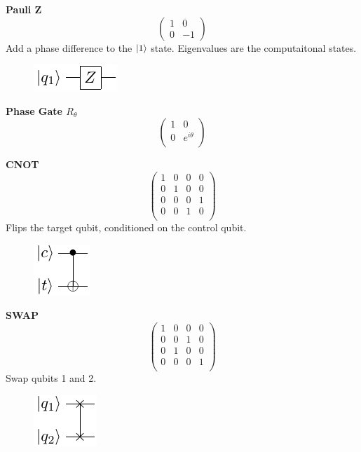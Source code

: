 \documentclass[11pt]{article}
\begin{document}
\textbf{Pauli Z}
\[\begin{pmatrix}
1 & 0 \\
0 & -1
\end{pmatrix}
\]
Add a phase difference to the $\ket{1}$ state. Eigenvalues are the computaitonal states.

\begin{figure}[h]
    \centering
    \includegraphics[width=.2\textwidth]{Circuits/Z.pdf}
\end{figure}

\textbf{Phase Gate $R_{\theta}$}
\[\begin{pmatrix}
1 & 0 \\
0 & e^{i\theta}\\
\end{pmatrix}\]

\textbf{CNOT}
\[\begin{pmatrix}
1 & 0 & 0 & 0 \\
0 & 1 & 0 & 0 \\
0 & 0 & 0 & 1 \\
0 & 0 & 1 & 0 \\
\end{pmatrix}
\]
Flips the target qubit, conditioned on the control qubit.

\begin{figure}[h]
    \centering
    \includegraphics[width=.2\textwidth]{Circuits/cnot.pdf}
\end{figure}

\textbf{SWAP}
\[\begin{pmatrix}
1 & 0 & 0 & 0 \\
0 & 0 & 1 & 0 \\
0 & 1 & 0 & 0 \\
0 & 0 & 0 & 1 \\
\end{pmatrix}\]
Swap qubits 1 and 2.

\begin{figure}[h]
    \centering
    \includegraphics[width=.2\textwidth]{Circuits/swap.pdf}
\end{figure}
\end{document}
